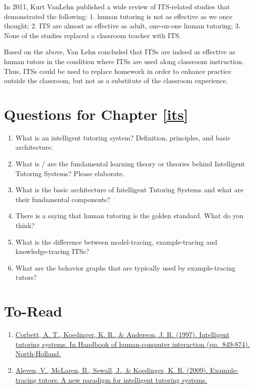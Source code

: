 \documentclass[
]{book}
\providecommand{\tightlist}{%
  \setlength{\itemsep}{0pt}\setlength{\parskip}{0pt}}
\begin{document}
In 2011, Kurt VanLehn \citep{vanlehn2011relative} published a wide review of ITS-related studies that demonstrated the following:
1. human tutoring is not as effective as we once thought;
2. ITS are almost as effective as adult, one-on-one human tutoring;
3. None of the studies replaced a classroom teacher with ITS.

Based on the above, Van Lehn concluded that ITSs are indeed as effective as human tutors in the condition where ITSs are used along classroom instruction. Thus, ITSs could be used to replace homework in order to enhance practice outside the classroom, but not as a substitute of the classroom experience.

\section{Questions for Chapter \ref{its}}\label{questions-for-chapter-refits}

\begin{enumerate}
\def\labelenumi{\arabic{enumi}.}
\tightlist
\item
  What is an intelligent tutoring system? Definition, principles, and basic architecture.
\item
  What is / are the fundamental learning theory or theories behind Intelligent Tutoring Systems? Please elaborate.
\item
  What is the basic architecture of Intelligent Tutoring Systems and what are their fundamental components?
\item
  There is a saying that human tutoring is the golden standard. What do you think?
\item
  What is the difference between model-tracing, example-tracing and knowledge-tracing ITSs?
\item
  What are the behavior graphs that are typically used by example-tracing tutors?
\end{enumerate}

\section{To-Read}\label{to-read-1}

\begin{enumerate}
\def\labelenumi{\arabic{enumi}.}
\tightlist
\item
  \href{http://act-r.psy.cmu.edu/wordpress/wp-content/uploads/2012/12/173Chapter_37_Intelligent_Tutoring_Systems.pdf}{Corbett, A. T., Koedinger, K. R., \& Anderson, J. R. (1997). Intelligent tutoring systems. In Handbook of human-computer interaction (pp.~849-874). North-Holland.}
\item
  \href{https://scholar.google.com/scholar?hl=en&as_sdt=0\%2C5&scioq=Toward+combining+individual+and+collaborative+learning+within+an+intelligent+tutoring+system.+In\%C2\%A0Artificial+Intelligence+in+Education&q=Example-Tracing+Tutors\%3A+A+New+Paradigm+for+Intelligent+Tutoring+Systems&btnG=\#:~:text=include\%20citations-,\%5BPDF\%5D\%20cmu.edu,-\%5BPDF\%5D\%20Example}{Aleven, V., McLaren, B., Sewall, J., \& Koedinger, K. R. (2009). Example-tracing tutors: A new paradigm for intelligent tutoring systems.}
\end{enumerate}
\end{document}
